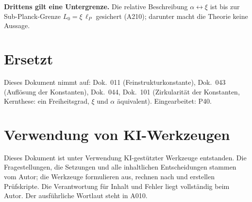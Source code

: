 \textbf{Drittens gilt eine Untergrenze.} Die relative Beschreibung
$\alpha \leftrightarrow \xi$ ist bis zur Sub-Planck-Grenze $L_0 = \xi\,\ell_P$
gesichert (A210); darunter macht die Theorie keine Aussage.

\section{Ersetzt}

Dieses Dokument nimmt auf: Dok.~011 (Feinstrukturkonstante), Dok.~043 (Auflösung
der Konstanten), Dok.~044, Dok.~101 (Zirkularität der Konstanten, Kernthese: ein
Freiheitsgrad, $\xi$ und $\alpha$ äquivalent). Eingearbeitet: P40.

\section{Verwendung von KI-Werkzeugen}

Dieses Dokument ist unter Verwendung KI-gestützter Werkzeuge entstanden. Die
Fragestellungen, die Setzungen und alle inhaltlichen Entscheidungen stammen vom
Autor; die Werkzeuge formulieren aus, rechnen nach und erstellen Prüfskripte.
Die Verantwortung für Inhalt und Fehler liegt vollständig beim Autor. Der
ausführliche Wortlaut steht in A010.
